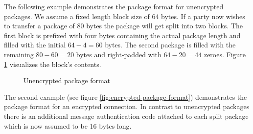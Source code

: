 The following example demonstrates the package format for unencrypted packages.
We assume a fixed length block size of 64 bytes.
If a party now wishes to transfer a package of 80 bytes the package will get split into two blocks.
The first block is prefixed with four bytes containing the actual package length and filled with the initial $64 - 4 = 60$ bytes.
The second package is filled with the remaining $80 - 60 = 20$ bytes and right-padded with $64 - 20 = 44$ zeroes.
Figure \ref{fig:unencrypted-package-format} visualizes the block's contents.

\begin{figure}
    \center


    \caption{Unencrypted package format}
    \label{fig:unencrypted-package-format}
\end{figure}

The second example (see figure \ref{fig:encrypted-package-format}) demonstrates the package format for an encrypted connection.
In contrast to unencrypted packages there is an additional message authentication code attached to each split package which is now assumed to be 16 bytes long.

